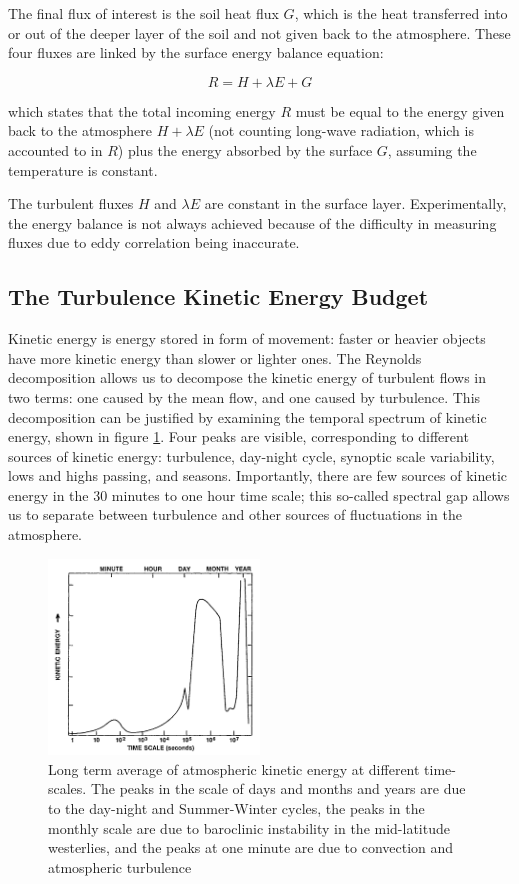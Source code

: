 \documentclass[12pt]{book}
\begin{document}
The final flux of interest is the soil heat flux $G$, which is the heat transferred into or out of the deeper layer of the soil and not given back to the atmosphere. These four fluxes are linked by the surface energy balance equation:

$$
R=H+\lambda E+G
$$

which states that the total incoming energy $R$ must be equal to the energy given back to the atmosphere $H+\lambda E$ (not counting long-wave radiation, which is accounted to in $R$) plus the energy absorbed by the surface $G$, assuming the temperature is constant.

The turbulent fluxes $H$ and $\lambda E$ are constant in the surface layer. Experimentally, the energy balance is not always achieved \citep{cabauwinsitu} because of the difficulty in measuring fluxes due to eddy correlation being inaccurate.

\subsection{The Turbulence Kinetic Energy Budget}
Kinetic energy is energy stored in form of movement: faster or heavier objects have more kinetic energy than slower or lighter ones. The Reynolds decomposition allows us to decompose the kinetic energy of turbulent flows in two terms: one caused by the mean flow, and one caused by turbulence. This decomposition can be justified by examining the temporal spectrum of kinetic energy, shown in figure \ref{fig:tkespectrum}. Four peaks are visible, corresponding to different sources of kinetic energy: turbulence, day-night cycle, synoptic scale variability, lows and highs passing, and seasons. Importantly, there are few sources of kinetic energy in the 30 minutes to one hour time scale; this so-called spectral gap allows us to separate between turbulence and other sources of fluctuations in the atmosphere.

\begin{figure}
\caption{Long term average of atmospheric kinetic energy at different time-scales. The peaks in the scale of days and months and years are due to the day-night and Summer-Winter cycles, the peaks in the monthly scale are due to baroclinic instability in the mid-latitude westerlies, and the peaks at one minute are due to convection and atmospheric turbulence \citep{tkespectrumsrc,tkespectrumorig}}
\label{fig:tkespectrum}
\centering
\includegraphics[width=0.5\textwidth]{images/kinetic_energy_spectrum}
\end{figure}
\end{document}
